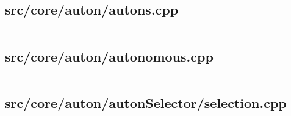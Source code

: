 \subsection{src/core/auton/autons.cpp}
\inputminted[linenos,tabsize=2,breaklines, breakanywhere]{c}{autons.cpp}
\pagebreak

\subsection{src/core/auton/autonomous.cpp}
\inputminted[linenos,tabsize=2,breaklines, breakanywhere]{c}{autonomous.cpp}
\pagebreak

\subsection{src/core/auton/autonSelector/selection.cpp}
\inputminted[linenos,tabsize=2,breaklines, breakanywhere]{c}{selection.cpp}
\pagebreak

